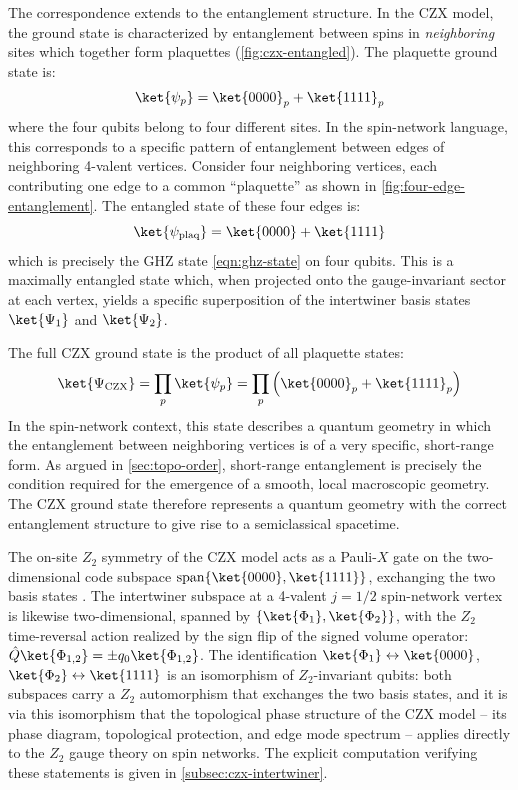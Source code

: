 The correspondence extends to the entanglement structure. In the CZX model, the ground state is characterized by entanglement between spins in \emph{neighboring} sites which together form plaquettes (\autoref{fig:czx-entangled}). The plaquette ground state is:
\begin{equation}\label{eqn:czx-plaquette-state}
	\ket{\psi_p} = \ket{0000}_p + \ket{1111}_p
\end{equation}
where the four qubits belong to four different sites. In the spin-network language, this corresponds to a specific pattern of entanglement between edges of neighboring 4-valent vertices. Consider four neighboring vertices, each contributing one edge to a common ``plaquette'' as shown in \autoref{fig:four-edge-entanglement}. The entangled state of these four edges is:
\begin{equation}\label{eqn:sn-plaquette-state}
	\ket{\psi_{\text{plaq}}} = \ket{0000} + \ket{1111}
\end{equation}
which is precisely the GHZ state \eqref{eqn:ghz-state} on four qubits. This is a maximally entangled state which, when projected onto the gauge-invariant sector at each vertex, yields a specific superposition of the intertwiner basis states $ \ket{\Psi_1} $ and $ \ket{\Psi_2} $.

The full CZX ground state is the product of all plaquette states:
\begin{equation}\label{eqn:czx-full-gs}
	\ket{\Psi_{\text{CZX}}} = \prod_p \ket{\psi_p} = \prod_p \left( \ket{0000}_p + \ket{1111}_p \right)
\end{equation}
In the spin-network context, this state describes a quantum geometry in which the entanglement between neighboring vertices is of a very specific, short-range form. As argued in \autoref{sec:topo-order}, short-range entanglement is precisely the condition required for the emergence of a smooth, local macroscopic geometry. The CZX ground state therefore represents a quantum geometry with the correct entanglement structure to give rise to a semiclassical spacetime.

The on-site $ Z_2 $ symmetry of the CZX model acts as a Pauli-$ X $ gate on the two-dimensional code subspace $ \operatorname{span}\{\ket{0000}, \ket{1111}\} $, exchanging the two basis states \cite{Chen2010Local}. The intertwiner subspace at a 4-valent $ j = 1/2 $ spin-network vertex is likewise two-dimensional, spanned by $ \{\ket{\Phi_1}, \ket{\Phi_2}\} $, with the $ Z_2 $ time-reversal action realized by the sign flip of the signed volume operator: $ \hat{Q} \ket{\Phi_{1,2}} = \pm q_0 \ket{\Phi_{1,2}} $. The identification $ \ket{\Phi_1} \leftrightarrow \ket{0000} $, $ \ket{\Phi_2} \leftrightarrow \ket{1111} $ is an isomorphism of $ Z_2 $-invariant qubits: both subspaces carry a $ Z_2 $ automorphism that exchanges the two basis states, and it is via this isomorphism that the topological phase structure of the CZX model -- its phase diagram, topological protection, and edge mode spectrum -- applies directly to the $ Z_2 $ gauge theory on spin networks. The explicit computation verifying these statements is given in \autoref{subsec:czx-intertwiner}.

